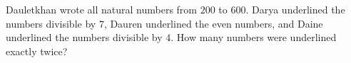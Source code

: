 Dauletkhan wrote all natural numbers from $200$ to $600$. Darya underlined the numbers divisible by $7$, Dauren underlined the even numbers, and Daine underlined the numbers divisible by $4$. How many numbers were underlined exactly twice?
